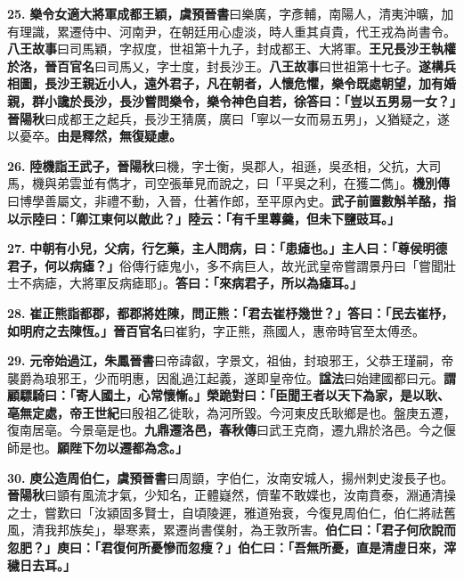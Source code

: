 \textbf{25.} \textbf{樂令女適大將軍成都王穎，}{\footnotesize \textbf{虞預晉書}曰樂廣，字彥輔，南陽人，清夷沖曠，加有理識，累遷侍中、河南尹，在朝廷用心虛淡，時人重其貞貴，代王戎為尚書令。\textbf{八王故事}曰司馬穎，字叔度，世祖第十九子，封成都王、大將軍。}\textbf{王兄長沙王執權於洛，}{\footnotesize \textbf{晉百官名}曰司馬乂，字士度，封長沙王。\textbf{八王故事}曰世祖第十七子。}\textbf{遂構兵相圖，長沙王親近小人，遠外君子，凡在朝者，人懷危懼，樂令既處朝望，加有婚親，群小讒於長沙，長沙嘗問樂令，樂令神色自若，徐答曰：「豈以五男易一女？」}{\footnotesize \textbf{晉陽秋}曰成都王之起兵，長沙王猜廣，廣曰「寧以一女而易五男」，乂猶疑之，遂以憂卒。}\textbf{由是釋然，無復疑慮。}

\textbf{26.} \textbf{陸機詣王武子，}{\footnotesize \textbf{晉陽秋}曰機，字士衡，吳郡人，祖遜，吳丞相，父抗，大司馬，機與弟雲並有儁才，司空張華見而說之，曰「平吳之利，在獲二儁」。\textbf{機別傳}曰博學善屬文，非禮不動，入晉，仕著作郎，至平原內史。}\textbf{武子前置數斛羊酪，指以示陸曰：「卿江東何以敵此？」陸云：「有千里蓴羹，但未下鹽豉耳。」}

\textbf{27.} \textbf{中朝有小兒，父病，行乞藥，主人問病，曰：「患瘧也。」主人曰：「尊侯明德君子，何以病瘧？」}{\footnotesize 俗傳行瘧鬼小，多不病巨人，故光武皇帝嘗謂景丹曰「嘗聞壯士不病瘧，大將軍反病瘧耶」。}\textbf{答曰：「來病君子，所以為瘧耳。」}

\textbf{28.} \textbf{崔正熊詣都郡，都郡將姓陳，問正熊：「君去崔杼幾世？」答曰：「民去崔杼，如明府之去陳恆。」}{\footnotesize \textbf{晉百官名}曰崔豹，字正熊，燕國人，惠帝時官至太傅丞。}

\textbf{29.} \textbf{元帝始過江，}{\footnotesize \textbf{朱鳳晉書}曰帝諱叡，字景文，祖伷，封琅邪王，父恭王瑾嗣，帝襲爵為琅邪王，少而明惠，因亂過江起義，遂即皇帝位。\textbf{諡法}曰始建國都曰元。}\textbf{謂顧驃騎曰：「寄人國土，心常懷慚。」榮跪對曰：「臣聞王者以天下為家，是以耿、亳無定處，}{\footnotesize \textbf{帝王世紀}曰殷祖乙徙耿，為河所毀。今河東皮氏耿鄉是也。盤庚五遷，復南居亳。今景亳是也。}\textbf{九鼎遷洛邑，}{\footnotesize \textbf{春秋傳}曰武王克商，遷九鼎於洛邑。今之偃師是也。}\textbf{願陛下勿以遷都為念。」}

\textbf{30.} \textbf{庾公造周伯仁，}{\footnotesize \textbf{虞預晉書}曰周顗，字伯仁，汝南安城人，揚州刺史浚長子也。\textbf{晉陽秋}曰顗有風流才氣，少知名，正體嶷然，儕輩不敢媟也，汝南賁泰，淵通清操之士，嘗歎曰「汝潁固多賢士，自頃陵遲，雅道殆衰，今復見周伯仁，伯仁將祛舊風，清我邦族矣」，舉寒素，累遷尚書僕射，為王敦所害。}\textbf{伯仁曰：「君子何欣說而忽肥？」庾曰：「君復何所憂慘而忽瘦？」伯仁曰：「吾無所憂，直是清虛日來，滓穢日去耳。」}

